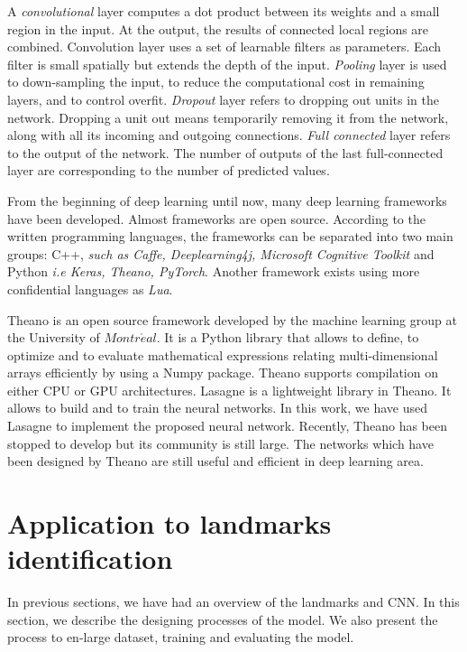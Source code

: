 \documentclass[conference]{IEEEtran}
\begin{document}
A \textit{convolutional} layer computes a dot product between its weights and a small region in the input. At the output, the results of connected local regions are combined. Convolution layer uses a set of learnable filters as parameters. Each filter is small spatially but extends the depth of the input. \textit{Pooling} layer is used to down-sampling the input, to reduce the computational cost in remaining layers, and to control overfit. \textit{Dropout} layer refers to dropping out units in the network. Dropping a unit out means temporarily removing it from the network, along with all its incoming and outgoing connections. \textit{Full connected} layer refers to the output of the network. The number of outputs of the last full-connected layer are corresponding to the number of predicted values.

From the beginning of deep learning until now, many deep learning frameworks have been developed. Almost frameworks are open source. According to the written programming languages, the frameworks can be separated into two main groups: C++, \textit{such as Caffe, Deeplearning4j, Microsoft Cognitive Toolkit} and Python \textit{i.e Keras, Theano, PyTorch}. Another framework exists using more confidential languages as \textit{Lua}.

Theano \cite{theanoframework} is an open source framework developed by the machine learning group at the University of $Montr\acute{e}al$. It is a Python library that allows to define, to optimize and to evaluate mathematical expressions relating multi-dimensional arrays efficiently by using a Numpy package. Theano supports compilation on either CPU or GPU architectures. Lasagne \cite{lasagne} is a lightweight library in Theano. It allows to build and to train the neural networks. In this work, we have used Lasagne to implement the proposed neural network. Recently, Theano has been stopped to develop but its community is still large. The networks which have been designed by Theano are still useful and efficient in deep learning area.
\section{Application to landmarks identification}
In previous sections, we have had an overview of the landmarks and CNN. In this section, we describe the designing processes of the model. We also present the process to en-large dataset, training and evaluating the model.
\end{document}
